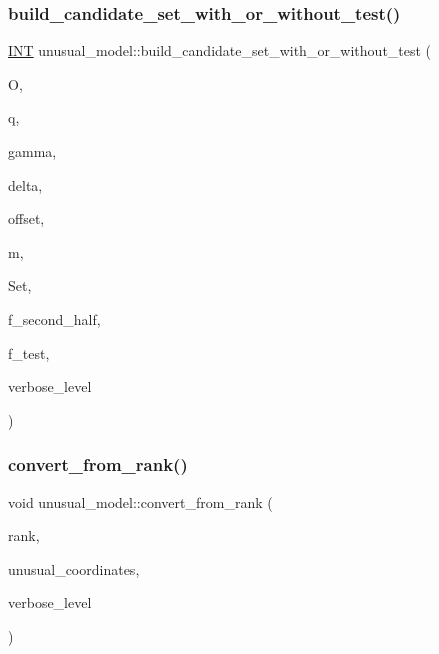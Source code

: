 \subsubsection{\texorpdfstring{build\+\_\+candidate\+\_\+set\+\_\+with\+\_\+or\+\_\+without\+\_\+test()}{build\_candidate\_set\_with\_or\_without\_test()}}
{\footnotesize\ttfamily \mbox{\hyperlink{galois_8h_a09fddde158a3a20bd2dcadb609de11dc}{I\+NT}} unusual\+\_\+model\+::build\+\_\+candidate\+\_\+set\+\_\+with\+\_\+or\+\_\+without\+\_\+test (\begin{DoxyParamCaption}\item[{\mbox{\hyperlink{classorthogonal}{orthogonal}} \&}]{O,  }\item[{\mbox{\hyperlink{galois_8h_a09fddde158a3a20bd2dcadb609de11dc}{I\+NT}}}]{q,  }\item[{\mbox{\hyperlink{galois_8h_a09fddde158a3a20bd2dcadb609de11dc}{I\+NT}}}]{gamma,  }\item[{\mbox{\hyperlink{galois_8h_a09fddde158a3a20bd2dcadb609de11dc}{I\+NT}}}]{delta,  }\item[{\mbox{\hyperlink{galois_8h_a09fddde158a3a20bd2dcadb609de11dc}{I\+NT}}}]{offset,  }\item[{\mbox{\hyperlink{galois_8h_a09fddde158a3a20bd2dcadb609de11dc}{I\+NT}}}]{m,  }\item[{\mbox{\hyperlink{galois_8h_a09fddde158a3a20bd2dcadb609de11dc}{I\+NT}} $\ast$}]{Set,  }\item[{\mbox{\hyperlink{galois_8h_a09fddde158a3a20bd2dcadb609de11dc}{I\+NT}}}]{f\+\_\+second\+\_\+half,  }\item[{\mbox{\hyperlink{galois_8h_a09fddde158a3a20bd2dcadb609de11dc}{I\+NT}}}]{f\+\_\+test,  }\item[{\mbox{\hyperlink{galois_8h_a09fddde158a3a20bd2dcadb609de11dc}{I\+NT}}}]{verbose\+\_\+level }\end{DoxyParamCaption})}

\mbox{\label{classunusual__model_a54cf56041ed1ebe0517a2a4005932249}} 
\subsubsection{\texorpdfstring{convert\+\_\+from\+\_\+rank()}{convert\_from\_rank()}}
{\footnotesize\ttfamily void unusual\+\_\+model\+::convert\+\_\+from\+\_\+rank (\begin{DoxyParamCaption}\item[{\mbox{\hyperlink{galois_8h_a09fddde158a3a20bd2dcadb609de11dc}{I\+NT}}}]{rank,  }\item[{\mbox{\hyperlink{galois_8h_a09fddde158a3a20bd2dcadb609de11dc}{I\+NT}} $\ast$}]{unusual\+\_\+coordinates,  }\item[{\mbox{\hyperlink{galois_8h_a09fddde158a3a20bd2dcadb609de11dc}{I\+NT}}}]{verbose\+\_\+level }\end{DoxyParamCaption})}

